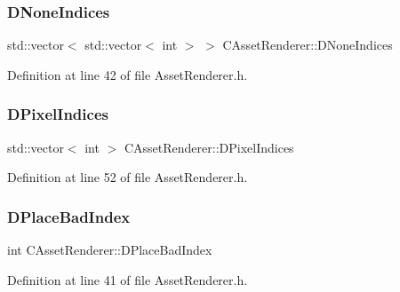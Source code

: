 \subsubsection{\texorpdfstring{D\+None\+Indices}{DNoneIndices}}
{\footnotesize\ttfamily std\+::vector$<$ std\+::vector$<$ int $>$ $>$ C\+Asset\+Renderer\+::\+D\+None\+Indices\hspace{0.3cm}{\ttfamily [protected]}}



Definition at line 42 of file Asset\+Renderer.\+h.

\hypertarget{classCAssetRenderer_aa1d9cd6de6b897ec0b5a244bf822e6bd}{}\label{classCAssetRenderer_aa1d9cd6de6b897ec0b5a244bf822e6bd} 
\subsubsection{\texorpdfstring{D\+Pixel\+Indices}{DPixelIndices}}
{\footnotesize\ttfamily std\+::vector$<$ int $>$ C\+Asset\+Renderer\+::\+D\+Pixel\+Indices\hspace{0.3cm}{\ttfamily [protected]}}



Definition at line 52 of file Asset\+Renderer.\+h.

\hypertarget{classCAssetRenderer_a765462ccdeccb81926f565e5d403ed6d}{}\label{classCAssetRenderer_a765462ccdeccb81926f565e5d403ed6d} 
\subsubsection{\texorpdfstring{D\+Place\+Bad\+Index}{DPlaceBadIndex}}
{\footnotesize\ttfamily int C\+Asset\+Renderer\+::\+D\+Place\+Bad\+Index\hspace{0.3cm}{\ttfamily [protected]}}



Definition at line 41 of file Asset\+Renderer.\+h.

\hypertarget{classCAssetRenderer_a2bf69fa52909e0daccd3b3afc8c79119}{}\label{classCAssetRenderer_a2bf69fa52909e0daccd3b3afc8c79119} 
